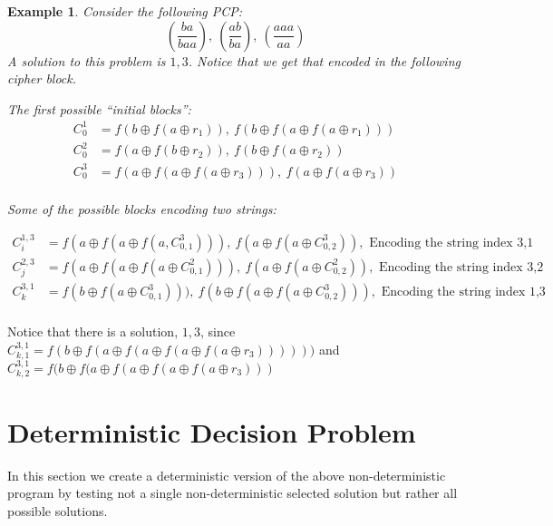 \documentclass[11pt,twoside,a4paper]{article}
\newtheorem{example}{Example}
\begin{document}
\begin{example}
	Consider the following PCP:
	\[
	(\frac{ba}{baa}),~(\frac{ab}{ba}),~(\frac{aaa}{aa})
	\] 
	A solution to this problem is $1,3$. Notice that we get that 
	encoded in the following cipher block.
	
	The first possible ``initial blocks'':
	\begin{align*}
	C^1_0 &= f(b \oplus f(a \oplus r_1)), ~f(b \oplus f(a \oplus f(a \oplus r_1)))\\
	C^2_0 &= f(a \oplus f(b \oplus r_2)), ~f(b \oplus f(a \oplus r_2))\\
	C^3_0 &= f(a \oplus f(a \oplus f(a \oplus r_3))), ~f(a \oplus f(a \oplus r_3))\\
	\end{align*}
	
	Some of the possible blocks encoding two strings:
	
\end{example}
\begin{align*}
C^{1,3}_i &= f(a \oplus f(a \oplus f(a, C^3_{0, 1}))), ~f(a \oplus f(a \oplus C^3_{0, 2})), \text{ Encoding the string index 3,1}\\
C^{2,3}_j &= f(a \oplus f(a \oplus f(a \oplus C^2_{0, 1}))), ~f(a \oplus f(a \oplus C^2_{0, 2})), \text{ Encoding the string index 3,2}\\
C^{3,1}_k &= f(b \oplus f(a \oplus C^3_{0, 1}))), ~f(b \oplus f(a \oplus f(a \oplus C^3_{0, 2}))), \text{ Encoding the string index 1,3}\\
\end{align*}

Notice that there is a solution, $1,3$, since 
$C^{3,1}_{k, 1} = f(b \oplus f(a \oplus f(a \oplus f(a \oplus f(a \oplus r_3))))))$
and 
$C^{3,1}_{k, 2} = f(b \oplus f(a \oplus f(a \oplus f(a \oplus f(a \oplus r_3)))$ 

\section{Deterministic Decision Problem}
In this section we create a deterministic version of the 
above non-deterministic program by testing not a single 
non-deterministic selected solution but rather all possible
solutions. 
\end{document}
